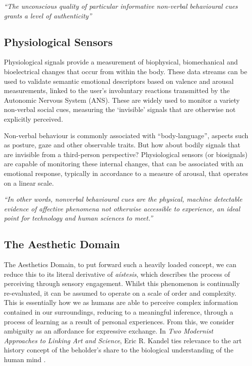 \textit{“The unconscious quality of particular informative non-verbal behavioural cues grants a level of authenticity”}  \cite{pentland_honest_2010}

\subsection{Physiological Sensors}

Physiological signals provide a measurement of biophysical, biomechanical and bioelectrical changes that occur from within the body. These data streams can be used to validate semantic emotional descriptors based on valence and arousal measurements, linked to the user’s involuntary reactions transmitted by the Autonomic Nervous System (ANS). These are widely used to monitor a variety non-verbal social cues, measuring the ‘invisible’ signals that are otherwise not explicitly perceived.

Non-verbal behaviour is commonly associated with “body-language”, aspects such as posture, gaze and other observable traits. But how about bodily signals that are invisible from a third-person perspective? Physiological sensors (or biosignals) are capable of monitoring these internal changes, that can be associated with an emotional response, typically in accordance to a measure of arousal, that operates on a linear scale.

\textit{“In other words, nonverbal behavioural cues are the physical, machine detectable evidence of affective phenomena not otherwise accessible to experience, an ideal point for technology and human sciences to meet.”}  \cite{vinciarelli_towards_2011}


\subsection{The Aesthetic Domain}

The Aesthetics Domain, to put forward such a heavily loaded concept, we can reduce this to its literal derivative of \textit{aístesis}, which describes the process of perceiving through sensory engagement. Whilst this phenomenon is continually re-evaluated, it can be assumed to operate on a scale of order and complexity. This is essentially how we as humans are able to perceive complex information contained in our surroundings, reducing to a meaningful inference, through a process of learning as a result of personal experiences. From this, we consider ambiguity as an affordance for expressive exchange. In \textit{Two Modernist Approaches to Linking Art and Science}, Eric R. Kandel ties relevance to the art history concept of the beholder's share to the biological understanding of the human mind \cite{kandel_two_2013}.

